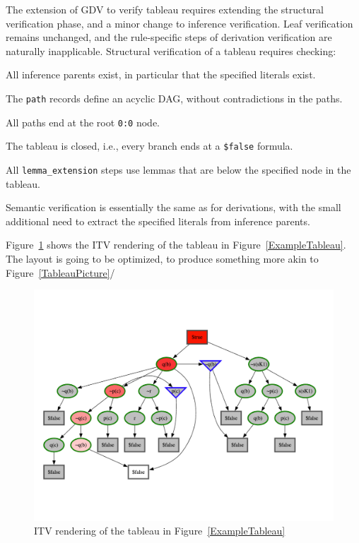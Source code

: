 \documentclass[runningheads]{llncs}
\newcommand{\smalltt}[1]{\small \texttt{#1}}
\newenvironment{packed_itemize}{
\vspace*{-0.2em}
\begin{itemize}
\setlength{\partopsep}{0pt}
\setlength{\itemsep}{1pt}
\setlength{\parskip}{0pt}
\setlength{\parsep}{0pt}
}{\end{itemize}}
\begin{document}
{The extension of GDV to verify tableau requires extending the structural verification phase,
and a minor change to inference verification.
Leaf verification remains unchanged, and the rule-specific steps of derivation verification
are naturally inapplicable.
Structural verification of a tableau requires checking:
\begin{packed_itemize}
\item All inference parents exist, in particular that the specified literals exist.
\item The {\smalltt{path}} records define an acyclic DAG, without contradictions in the paths.
\item All paths end at the root {\smalltt{0:0}} node.
\item The tableau is closed, i.e., every branch ends at a {\smalltt{\$false}} formula.
\item All {\tt lemma\_extension} steps use lemmas that are below the specified node in the tableau.
\end{packed_itemize}
Semantic verification is essentially the same as for derivations, with the small additional need 
to extract the specified literals from inference parents.

Figure~\ref{ITVTableau} shows the ITV rendering of the tableau in Figure~\ref{ExampleTableau}.
The layout is going to be optimized, to produce something more akin to Figure~\ref{TableauPicture}/

\begin{figure}[htb]
\centering
\includegraphics[width=1.0\textwidth]{PaperFOFITV.pdf}
\vspace*{-1em}
\caption{ITV rendering of the tableau in Figure~\ref{ExampleTableau}}
\label{ITVTableau}
\end{figure}

}
\end{document}
